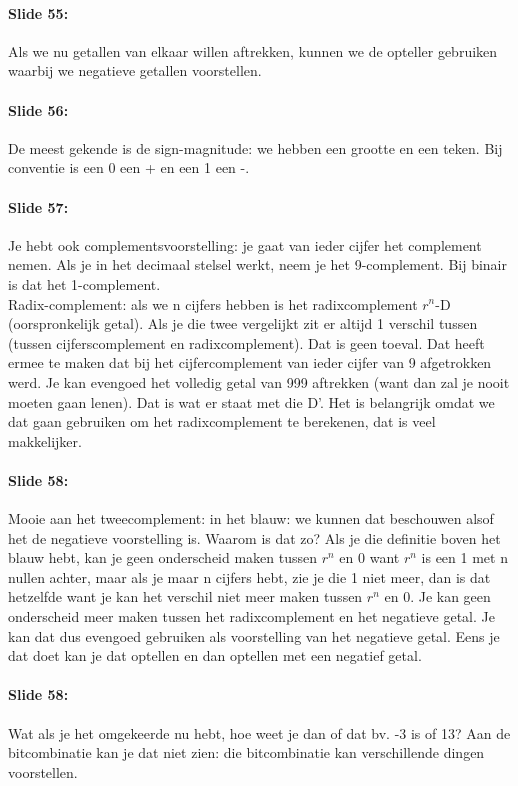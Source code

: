 \documentclass[10pt,a4paper]{book}
\begin{document}
\paragraph{Slide 55:} Als we nu getallen van elkaar willen aftrekken, kunnen we de opteller gebruiken waarbij we negatieve getallen voorstellen. 

\paragraph{Slide 56:} De meest gekende is de sign-magnitude: we hebben een grootte en een teken. Bij conventie is een 0 een + en een 1 een -.

\paragraph{Slide 57:} Je hebt ook complementsvoorstelling: je gaat van ieder cijfer het complement nemen. Als je in het decimaal stelsel werkt, neem je het 9-complement. Bij binair is dat het 1-complement.\\
Radix-complement: als we n cijfers hebben is het radixcomplement $r^n$-D (oorspronkelijk getal). Als je die twee vergelijkt zit er altijd 1 verschil tussen (tussen cijferscomplement en radixcomplement). Dat is geen toeval. Dat heeft ermee te maken dat bij het cijfercomplement van ieder cijfer van 9 afgetrokken werd. Je kan evengoed het volledig getal van 999 aftrekken (want dan zal je nooit moeten gaan lenen). Dat is wat er staat met die D'. Het is belangrijk omdat we dat gaan gebruiken om het radixcomplement te berekenen, dat is veel makkelijker.

\paragraph{Slide 58:} Mooie aan het tweecomplement: in het blauw: we kunnen dat beschouwen alsof het de negatieve voorstelling is. Waarom is dat zo? Als je die definitie boven het blauw hebt, kan je geen onderscheid maken tussen $r^n$ en 0 want $r^n$ is een 1 met n nullen achter, maar als je maar n cijfers hebt, zie je die 1 niet meer, dan is dat hetzelfde want je kan het verschil niet meer maken tussen $r^n$ en 0. Je kan geen onderscheid meer maken tussen het radixcomplement en het negatieve getal. Je kan dat dus evengoed gebruiken als voorstelling van het negatieve getal. Eens je dat doet kan je dat optellen en dan optellen met een negatief getal. 

\paragraph{Slide 58:} Wat als je het omgekeerde nu hebt, hoe weet je dan of dat bv. -3 is of 13? Aan de bitcombinatie kan je dat niet zien: die bitcombinatie kan verschillende dingen voorstellen.
\end{document}
